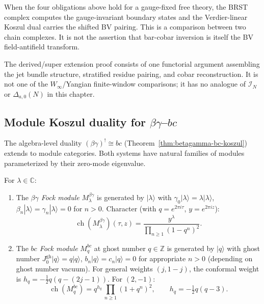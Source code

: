 \begin{example}[BV interpretation]
When the four obligations above hold for a gauge-fixed free theory,
the BRST complex computes the gauge-invariant boundary states and the
Verdier-linear Koszul dual carries the shifted BV pairing. This is a
comparison between two chain complexes. It is not the assertion that
bar-cobar inversion is itself the BV field-antifield transform.
\end{example}

\begin{remark}\label{rem:extended-ferm-ghost-scope}
The derived/super extension proof consists of one functorial argument
assembling the jet bundle structure, stratified residue pairing, and
cobar reconstruction. It is not one of the $W_\infty$/Yangian
finite-window comparisons; it has no analogue of
$\mathcal{I}_N$ or $\Delta_{a,0}(N)$ in this chapter.
\end{remark}


\subsection{Module Koszul duality for \texorpdfstring{$\beta\gamma$--$bc$}{betagamma--bc}}
\label{sec:betagamma-bc-modules}

The algebra-level duality $(\beta\gamma)^! \cong bc$
(Theorem~\ref{thm:betagamma-bc-koszul}) extends to module
categories. Both systems have natural families of modules
parameterized by their zero-mode eigenvalue.

\begin{definition}
\label{def:bg-bc-fock}
For $\lambda \in \mathbb{C}$:
\begin{enumerate}[label=\textup{(\roman*)}]
\item The \emph{$\beta\gamma$ Fock module} $M_\lambda^{\beta\gamma}$
 is generated by $|\lambda\rangle$ with
 $\gamma_0|\lambda\rangle = \lambda|\lambda\rangle$,
 $\beta_n|\lambda\rangle = \gamma_n|\lambda\rangle = 0$ for
 $n > 0$. Character (with $q = e^{2\pi i\tau}$,
 $y = e^{2\pi i z}$):
 \[
 \operatorname{ch}(M_\lambda^{\beta\gamma})(\tau, z)
 = \frac{y^{\lambda}}{\prod_{n \geq 1}(1 - q^n)^2}.
 \]
\item The \emph{$bc$ Fock module} $M_q^{bc}$ at ghost number
 $q \in \mathbb{Z}$ is generated by $|q\rangle$ with
 ghost number $J_0^{\mathrm{gh}}|q\rangle = q|q\rangle$,
 $b_n|q\rangle = c_n|q\rangle = 0$ for appropriate
 $n > 0$ (depending on ghost number vacuum).
 For general weights $(j, 1{-}j)$, the conformal weight is
 $h_q = -\tfrac{1}{2}q(q - (2j{-}1))$. For $(2, -1)$:
 \[
 \operatorname{ch}(M_q^{bc})
 = q^{h_q}\,\prod_{n \geq 1}(1 + q^n)^2,
 \qquad h_q = -\tfrac{1}{2}q(q-3).
 \]
\end{enumerate}
\end{definition}

